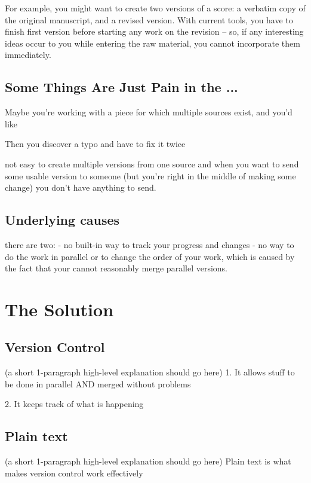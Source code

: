 \documentclass[11pt,a4paper]{article}
\begin{document}
For example, you might want to create two versions of a score:
a verbatim copy of the original manuscript, and a revised version.
With current tools, you have to finish first version before starting
any work on the revision -- so, if any interesting ideas occur to you
while entering the raw material, you cannot incorporate them immediately.

\subsection{Some Things Are Just Pain in the ...}
Maybe you're working with a piece for which multiple sources exist,
and you'd like 

Then you discover a typo and have to fix it twice

not easy to create multiple versions from one source
and when you want to send some usable version to someone
(but you're right in the middle of making some change)
you don't have anything to send.

\subsection{Underlying causes}
there are two:
- no built-in way to track your progress and changes
- no way to do the work in parallel or to change the order of your work, 
which is caused by the fact that your cannot reasonably merge parallel versions.


\section{The Solution}


\subsection{Version Control}
(a short 1-paragraph high-level explanation should go here)
1. It allows stuff to be done in parallel AND merged without problems

2. It keeps track of what is happening

\subsection{Plain text}
(a short 1-paragraph high-level explanation should go here)
Plain text is what makes version control work effectively
\end{document}
